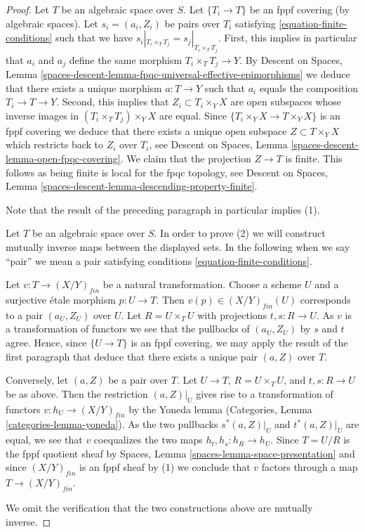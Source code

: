 \documentclass{stacks-project}
\theoremstyle{plain}
\theoremstyle{definition}
\theoremstyle{remark}
\numberwithin{equation}{subsection}
\begin{document}
\begin{proof}
Let $T$ be an algebraic space over $S$.
Let $\{T_i \to T\}$ be an fppf covering (by algebraic spaces).
Let $s_i = (a_i, Z_i)$ be pairs over $T_i$
satisfying \ref{equation-finite-conditions}
such that we have $s_i|_{T_i \times_T T_j} = s_j|_{T_i \times_T T_j}$.
First, this implies in particular that $a_i$ and $a_j$ define the same
morphism $T_i \times_T T_j \to Y$. By
Descent on Spaces,
Lemma \ref{spaces-descent-lemma-fpqc-universal-effective-epimorphisms}
we deduce that there exists a unique morphism $a : T \to Y$
such that $a_i$ equals the composition $T_i \to T \to Y$.
Second, this implies that $Z_i \subset T_i \times_Y X$ are open subspaces
whose inverse images in $(T_i \times_T T_j) \times_Y X$ are equal.
Since $\{T_i \times_Y X \to T \times_Y X\}$ is an fppf covering
we deduce that there exists a unique open subspace $Z \subset T \times_Y X$
which restricts back to $Z_i$ over $T_i$, see
Descent on Spaces, Lemma \ref{spaces-descent-lemma-open-fpqc-covering}.
We claim that the projection $Z \to T$ is finite.
This follows as being finite is local for the fpqc topology, see
Descent on Spaces, Lemma \ref{spaces-descent-lemma-descending-property-finite}.

\medskip\noindent
Note that the result of the preceding paragraph in particular implies (1).

\medskip\noindent
Let $T$ be an algebraic space over $S$. In order to prove (2) we will
construct mutually inverse maps between the displayed sets. In the
following when we say ``pair'' we mean a pair satisfying
conditions \ref{equation-finite-conditions}.

\medskip\noindent
Let $v : T \to (X/Y)_{fin}$ be a natural transformation.
Choose a scheme $U$ and a surjective \'etale morphism $p : U \to T$.
Then $v(p) \in (X/Y)_{fin}(U)$ corresponds to a pair $(a_U, Z_U)$
over $U$. Let $R = U \times_T U$ with projections $t, s : R \to U$.
As $v$ is a transformation of functors we see that the pullbacks of
$(a_U, Z_U)$ by $s$ and $t$ agree. Hence, since $\{U \to T\}$ is an
fppf covering, we may apply the result of the first paragraph that
deduce that there exists a unique pair $(a, Z)$ over $T$.

\medskip\noindent
Conversely, let $(a, Z)$ be a pair over $T$.
Let $U \to T$, $R = U \times_T U$, and $t, s : R \to U$ be as
above. Then the restriction $(a, Z)|_U$ gives rise to a
transformation of functors $v : h_U \to (X/Y)_{fin}$ by the
Yoneda lemma
(Categories, Lemma \ref{categories-lemma-yoneda}).
As the two pullbacks $s^*(a, Z)|_U$ and $t^*(a, Z)|_U$
are equal, we see that $v$ coequalizes the two maps
$h_t, h_s : h_R \to h_U$. Since $T = U/R$ is the fppf quotient sheaf by
Spaces, Lemma \ref{spaces-lemma-space-presentation}
and since $(X/Y)_{fin}$ is an fppf sheaf by (1) we conclude
that $v$ factors through a map $T \to (X/Y)_{fin}$.

\medskip\noindent
We omit the verification that the two constructions above are mutually
inverse.
\end{proof}
\end{document}
